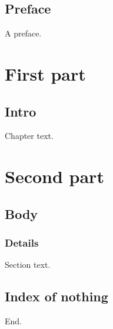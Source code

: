 \documentclass{book}
\begin{document}
\frontmatter
\chapter*{Preface}
A preface.
\mainmatter
\part{First part}
\chapter{Intro}
Chapter text.
\part{Second part}
\chapter{Body}
\section{Details}
Section text.
\backmatter
\chapter*{Index of nothing}
End.
\end{document}
